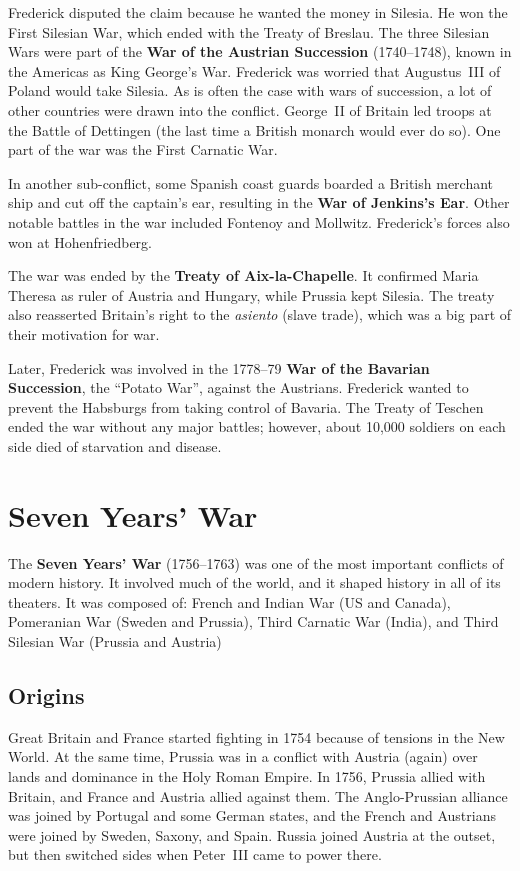 Frederick disputed the claim because he wanted the money in Silesia.
He won the First Silesian War, which ended with the Treaty of Breslau.
The three Silesian Wars were part of the \textbf{War of the Austrian Succession} (1740--1748),
known in the Americas as King George's War.
Frederick was worried that Augustus~III of Poland would take Silesia.
As is often the case with wars of succession, a lot of other countries were drawn into the conflict.
George~II of Britain led troops at the Battle of Dettingen (the last time a British monarch would ever do so).
One part of the war was the First Carnatic War.

In another sub-conflict, some Spanish coast guards boarded a British merchant ship and cut off the captain's ear,
resulting in the \textbf{War of Jenkins's Ear}.
Other notable battles in the war included Fontenoy and Mollwitz.
Frederick's forces also won at Hohenfriedberg.

The war was ended by the \textbf{Treaty of Aix-la-Chapelle}.
It confirmed Maria Theresa as ruler of Austria and Hungary, while Prussia kept Silesia.
The treaty also reasserted Britain's right to the \textit{asiento} (slave trade),
which was a big part of their motivation for war.

Later, Frederick was involved in the 1778--79 \textbf{War of the Bavarian Succession},
the ``Potato War'', against the Austrians.
Frederick wanted to prevent the Habsburgs from taking control of Bavaria.
The Treaty of Teschen ended the war without any major battles;
however, about 10,000 soldiers on each side died of starvation and disease.

\section{Seven Years' War}

The \textbf{Seven Years' War} (1756--1763) was one of the most important conflicts of modern history.
It involved much of the world, and it shaped history in all of its theaters.
It was composed of:
French and Indian War (US and Canada),
Pomeranian War (Sweden and Prussia),
Third Carnatic War (India),
and Third Silesian War (Prussia and Austria)

\subsection*{Origins}

Great Britain and France started fighting in 1754 because of tensions in the New World.
At the same time, Prussia was in a conflict with Austria (again) over lands and dominance in the Holy Roman Empire.
In 1756, Prussia allied with Britain, and France and Austria allied against them.
The Anglo-Prussian alliance was joined by Portugal and some German states,
and the French and Austrians were joined by Sweden, Saxony, and Spain.
Russia joined Austria at the outset, but then switched sides when Peter~III came to power there.

